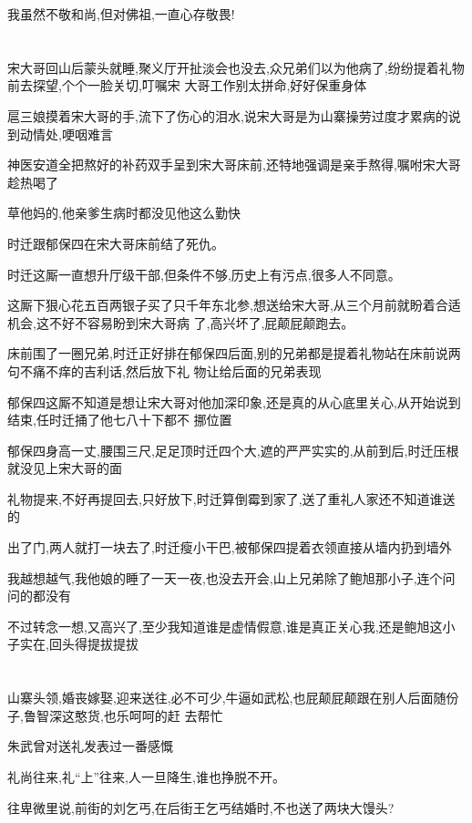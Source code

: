 ﻿\documentclass[12pt]{article}
\begin{document}
我虽然不敬和尚,但对佛祖,一直心存敬畏!
\section{}

宋大哥回山后蒙头就睡,聚义厅开扯淡会也没去,众兄弟们以为他病了,纷纷提着礼物前去探望,个个一脸关切,叮嘱宋
大哥工作别太拼命,好好保重身体\dldots

扈三娘摸着宋大哥的手,流下了伤心的泪水,说宋大哥是为山寨操劳过度才累病的\dldots 说到动情处,哽咽难言
\dldots

神医安道全把熬好的补药双手呈到宋大哥床前,还特地强调是亲手熬得,嘱咐宋大哥趁热喝了\dldots

草他妈的,他亲爹生病时都没见他这么勤快

时迁跟郁保四在宋大哥床前结了死仇。

时迁这厮一直想升厅级干部,但条件不够,历史上有污点,很多人不同意。

这厮下狠心花五百两银子买了只千年东北参,想送给宋大哥,从三个月前就盼着合适机会,这不好不容易盼到宋大哥病
了,高兴坏了,屁颠屁颠跑去。

床前围了一圈兄弟,时迁正好排在郁保四后面,别的兄弟都是提着礼物站在床前说两句不痛不痒的吉利话,然后放下礼
物让给后面的兄弟表现

郁保四这厮不知道是想让宋大哥对他加深印象,还是真的从心底里关心,从开始说到结束,任时迁捅了他七八十下都不
挪位置

郁保四身高一丈,腰围三尺,足足顶时迁四个大,遮的严严实实的,从前到后,时迁压根就没见上宋大哥的面

礼物提来,不好再提回去,只好放下,时迁算倒霉到家了,送了重礼人家还不知道谁送的

出了门,两人就打一块去了,时迁瘦小干巴,被郁保四提着衣领直接从墙内扔到墙外\dldots

我越想越气,我他娘的睡了一天一夜,也没去开会,山上兄弟除了鲍旭那小子,连个问问的都没有\dldots

不过转念一想,又高兴了,至少我知道谁是虚情假意,谁是真正关心我,还是鲍旭这小子实在,回头得提拔提拔\dldots
\section{}

山寨头领,婚丧嫁娶,迎来送往,必不可少,牛逼如武松,也屁颠屁颠跟在别人后面随份子,鲁智深这憨货,也乐呵呵的赶
去帮忙

朱武曾对送礼发表过一番感慨

礼尚往来,礼``上''往来,人一旦降生,谁也挣脱不开。

往卑微里说,前街的刘乞丐,在后街王乞丐结婚时,不也送了两块大馒头?
\end{document}
